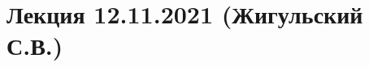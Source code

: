 \documentclass[main.tex]{subfiles}
\begin{document}
\section{Лекция 12.11.2021 (Жигульский С.В.)}
\end{document}
